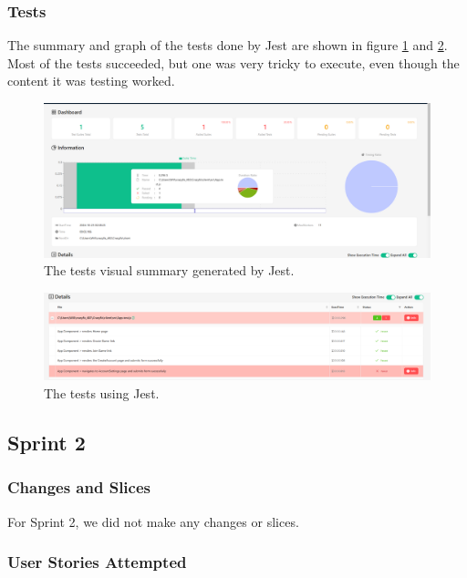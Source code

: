 \documentclass{article}
\begin{document}
\subsubsection{Tests}
The summary and graph of the tests done by Jest are shown in figure \ref{fig:test1} and \ref{fig:test2}. Most of the tests succeeded, but one was very tricky to execute, even though the content it was testing worked.

\begin{figure}[h]
\centering
\includegraphics[width=\linewidth]{tests1.png}
\caption{\label{fig:test1}The tests visual summary generated by Jest.}
\end{figure}

\begin{figure}[h]
\centering
\includegraphics[width=\linewidth]{tests2.png}
\caption{\label{fig:test2}The tests using Jest.}
\end{figure}

\subsection{Sprint 2}

\subsubsection{Changes and Slices}
For Sprint 2, we did not make any changes or slices.

\subsubsection{User Stories Attempted}
\end{document}
